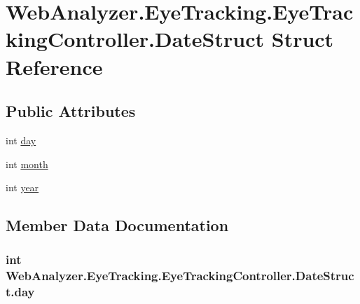 \hypertarget{struct_web_analyzer_1_1_eye_tracking_1_1_eye_tracking_controller_1_1_date_struct}{}\section{Web\+Analyzer.\+Eye\+Tracking.\+Eye\+Tracking\+Controller.\+Date\+Struct Struct Reference}
\label{struct_web_analyzer_1_1_eye_tracking_1_1_eye_tracking_controller_1_1_date_struct}
\subsection*{Public Attributes}
\begin{DoxyCompactItemize}
\item 
int \hyperlink{struct_web_analyzer_1_1_eye_tracking_1_1_eye_tracking_controller_1_1_date_struct_a81822d115a0593283bfee09a2a356e0b}{day}
\item 
int \hyperlink{struct_web_analyzer_1_1_eye_tracking_1_1_eye_tracking_controller_1_1_date_struct_a56a535cacf3097374d4aaa047bb5613f}{month}
\item 
int \hyperlink{struct_web_analyzer_1_1_eye_tracking_1_1_eye_tracking_controller_1_1_date_struct_a94165834519ba2ed3da89d083a456b11}{year}
\end{DoxyCompactItemize}


\subsection{Member Data Documentation}
\hypertarget{struct_web_analyzer_1_1_eye_tracking_1_1_eye_tracking_controller_1_1_date_struct_a81822d115a0593283bfee09a2a356e0b}{}
\subsubsection[{day}]{\setlength{\rightskip}{0pt plus 5cm}int Web\+Analyzer.\+Eye\+Tracking.\+Eye\+Tracking\+Controller.\+Date\+Struct.\+day}\label{struct_web_analyzer_1_1_eye_tracking_1_1_eye_tracking_controller_1_1_date_struct_a81822d115a0593283bfee09a2a356e0b}
\hypertarget{struct_web_analyzer_1_1_eye_tracking_1_1_eye_tracking_controller_1_1_date_struct_a56a535cacf3097374d4aaa047bb5613f}{}
